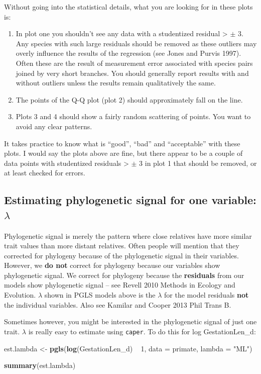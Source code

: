 \documentclass[12pt]{article}
\newcommand{\KeywordTok}[1]{\textcolor[rgb]{0.13,0.29,0.53}{\textbf{{#1}}}}
\newcommand{\DataTypeTok}[1]{\textcolor[rgb]{0.13,0.29,0.53}{{#1}}}
\newcommand{\DecValTok}[1]{\textcolor[rgb]{0.00,0.00,0.81}{{#1}}}
\newcommand{\StringTok}[1]{\textcolor[rgb]{0.31,0.60,0.02}{{#1}}}
\newcommand{\NormalTok}[1]{{#1}}
\begin{document}
\newpage
Without going into the statistical details, what you are looking for in these plots is:
\begin{enumerate}
\item In plot one you shouldn't see any data with a studentized residual > $\pm$ 3. 
Any species with such large residuals should be removed as these outliers may overly influence the results of the regression (see Jones and Purvis 1997). Often these are the result of measurement error associated with species pairs joined by very short branches. You should generally report results with and without outliers unless the results remain qualitatively the same.
\item The points of the Q-Q plot (plot 2) should approximately fall on the line.
\item Plots 3 and 4 should show a fairly random scattering of points. You want to avoid any clear patterns.
\end{enumerate}

It takes practice to know what is ``good'', ``bad'' and ``acceptable'' with these plots. I would say the plots above are fine, but there appear to be a couple of data points with studentized residuals > $\pm$ 3 in plot 1 that should be removed, or at least checked for errors. 

\subsection{Estimating phylogenetic signal for one variable: $\lambda$}
Phylogenetic signal is merely the pattern where close relatives have more similar trait values than more distant relatives. Often people will mention that they corrected for phylogeny because of the phylogenetic signal in their variables. However, we \textbf{do not} correct for phylogeny because our variables show phylogenetic signal. We correct for phylogeny because the \textbf{residuals} from our models show phylogenetic signal – see Revell 2010 Methods in Ecology and Evolution. $\lambda$ shown in PGLS models above is the $\lambda$ for the model residuals \textbf{not} the individual variables. Also see Kamilar and Cooper 2013 Phil Trans B.

Sometimes however, you might be interested in the phylogenetic signal of just one trait. $\lambda$ is really easy to estimate using \texttt{caper}. To do this for log GestationLen\_d:

\begin{snugshade}
\begin{Highlighting}[]
\NormalTok{est.lambda <-}\StringTok{ }\KeywordTok{pgls}\NormalTok{(}\KeywordTok{log}\NormalTok{(GestationLen_d) ~}\StringTok{ }\DecValTok{1}\NormalTok{, }\DataTypeTok{data =} \NormalTok{primate, }\DataTypeTok{lambda =} \StringTok{"ML"}\NormalTok{)}

\KeywordTok{summary}\NormalTok{(est.lambda)}
\end{Highlighting}
\end{snugshade}
\end{document}
